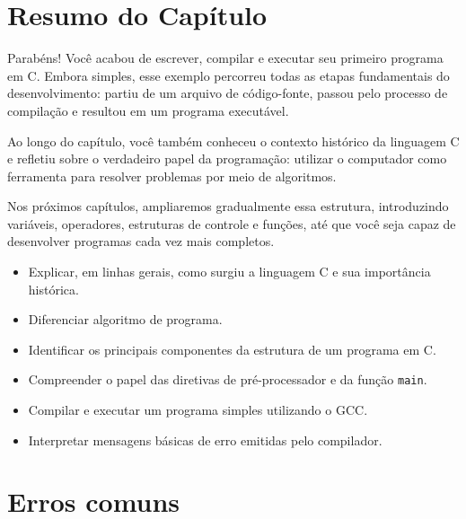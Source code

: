 \documentclass[12pt,a4paper,oneside]{extreport}
\begin{document}
\section*{Resumo do Capítulo}

Parabéns! Você acabou de escrever, compilar e executar seu primeiro programa em C. Embora simples, esse exemplo percorreu todas as etapas fundamentais do desenvolvimento: partiu de um arquivo de código-fonte, passou pelo processo de compilação e resultou em um programa executável.

Ao longo do capítulo, você também conheceu o contexto histórico da linguagem C e refletiu sobre o verdadeiro papel da programação: utilizar o computador como ferramenta para resolver problemas por meio de algoritmos.

Nos próximos capítulos, ampliaremos gradualmente essa estrutura, introduzindo variáveis, operadores, estruturas de controle e funções, até que você seja capaz de desenvolver programas cada vez mais completos.

\begin{objetivos}

\begin{itemize}
    \item Explicar, em linhas gerais, como surgiu a linguagem C e sua importância histórica.
    \item Diferenciar algoritmo de programa.
    \item Identificar os principais componentes da estrutura de um programa em C.
    \item Compreender o papel das diretivas de pré-processador e da função \texttt{main}.
    \item Compilar e executar um programa simples utilizando o GCC.
    \item Interpretar mensagens básicas de erro emitidas pelo compilador.
\end{itemize}

\end{objetivos}

\section*{Erros comuns}
\end{document}

